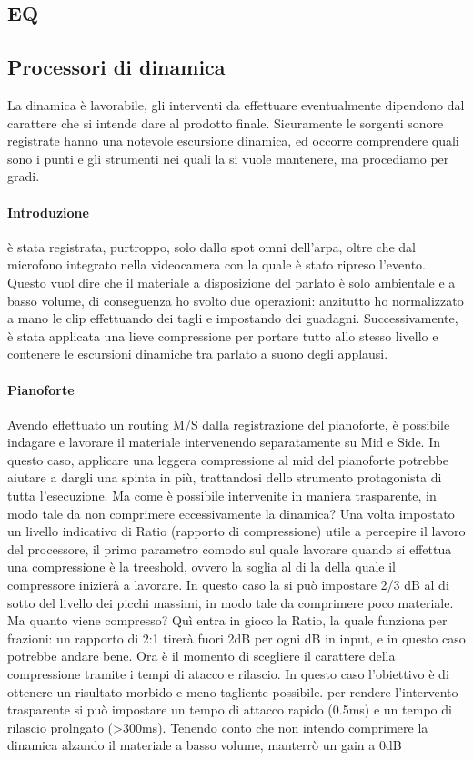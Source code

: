 	\subsection{EQ}
	
	\subsection{Processori di dinamica}
	La dinamica è lavorabile, gli interventi da effettuare eventualmente dipendono dal carattere che si intende dare al prodotto finale. Sicuramente le sorgenti sonore registrate hanno una notevole escursione dinamica, ed occorre comprendere quali sono i punti e gli strumenti nei quali la si vuole mantenere, ma procediamo per gradi.
	
		\paragraph{Introduzione} è stata registrata, purtroppo, solo dallo spot omni dell'arpa, oltre che dal microfono integrato nella videocamera con la quale è stato ripreso l'evento. Questo vuol dire che il materiale a disposizione del parlato è solo ambientale e a basso volume, di conseguenza ho svolto due operazioni: anzitutto ho normalizzato a mano le clip effettuando dei tagli e impostando dei guadagni. Successivamente, è stata applicata una lieve compressione per portare tutto allo stesso livello e contenere le escursioni dinamiche tra parlato a suono degli applausi.
		
		\paragraph{Pianoforte} Avendo effettuato un routing M/S dalla registrazione del pianoforte, è possibile indagare e lavorare il materiale intervenendo separatamente su Mid e Side. In questo caso, applicare una leggera compressione al mid del pianoforte potrebbe aiutare a dargli una spinta in più, trattandosi dello strumento protagonista di tutta l'esecuzione. Ma come è possibile intervenite in maniera trasparente, in modo tale da non comprimere eccessivamente la dinamica? Una volta impostato un livello indicativo di Ratio (rapporto di compressione) utile a percepire il lavoro del processore, il primo parametro comodo sul quale lavorare quando si effettua una compressione è la treeshold, ovvero la soglia al di la della quale il compressore inizierà a lavorare. In questo caso la si può impostare 2/3 dB al di sotto del livello dei picchi massimi, in modo tale da comprimere poco materiale. Ma quanto viene compresso? Quì entra in gioco la Ratio, la quale funziona per frazioni: un rapporto di 2:1 tirerà fuori 2dB per ogni dB in input, e in questo caso potrebbe andare bene.
		Ora è il momento di scegliere il carattere della compressione tramite i tempi di atacco e rilascio. In questo caso l'obiettivo è di ottenere un risultato morbido e meno tagliente possibile. per rendere l'intervento trasparente si può impostare un tempo di attacco rapido (0.5ms) e un tempo di rilascio prolngato (>300ms).
		Tenendo conto che non intendo comprimere la dinamica alzando il materiale a basso volume, manterrò un gain a 0dB
	
